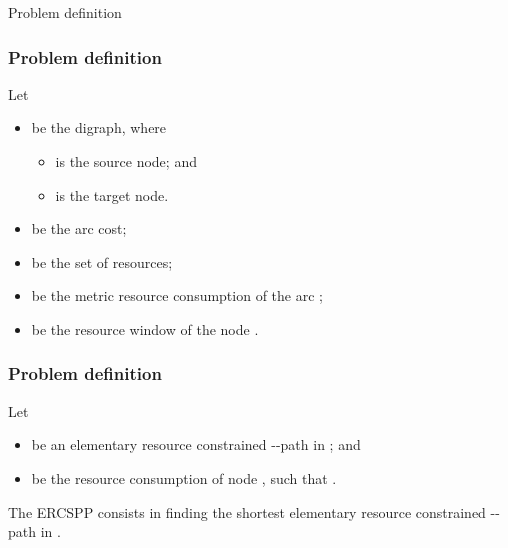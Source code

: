 \begin{frame}
  \begin{center}
    \Huge Problem definition
  \end{center}
\end{frame}

\begin{frame}
  \frametitle{Problem definition}
  Let
  \begin{itemize}
    \item {} be the digraph, where
    \begin{itemize}
      \item {} is the source node; and 
      \item {} is the target node.
    \end{itemize}
    \item {} be the arc  cost;
    \item {} be the set of resources;
    \item {} be the metric resource  consumption of the arc ;
    \item {} be the resource  window of the node .
  \end{itemize}
\end{frame}

\begin{frame}
  \frametitle{Problem definition}
  Let
  \begin{itemize}
    \item {} be an elementary resource constrained --path in ; and
    \item {} be the resource  consumption of node ,
  such that .
  \end{itemize}
  The ERCSPP consists in finding the shortest elementary resource constrained --path  in .
\end{frame}


